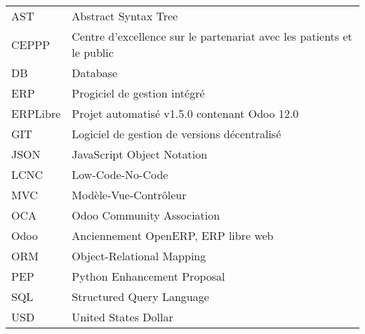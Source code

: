 \chapter*{\abbrevname}
\pagestyle{pagenumber}
%
\begin{acronym}
\end{acronym}
%
\begin{longtable}{lp{5in}}
AST       & Abstract Syntax Tree\\
CEPPP     & Centre d'excellence sur le partenariat avec les patients et le public\\
DB        & Database\\
ERP       & Progiciel de gestion intégré\\
ERPLibre  & Projet automatisé v1.5.0 contenant Odoo 12.0\\
GIT       & Logiciel de gestion de versions décentralisé\\
JSON      & JavaScript Object Notation\\
LCNC      & Low-Code-No-Code\\
MVC       & Modèle-Vue-Contrôleur\\
OCA       & Odoo Community Association\\
Odoo      & Anciennement OpenERP, ERP libre web\\
ORM       & Object-Relational Mapping\\
PEP       & Python Enhancement Proposal\\
SQL       & Structured Query Language\\
USD       & United States Dollar\\

\end{longtable}
